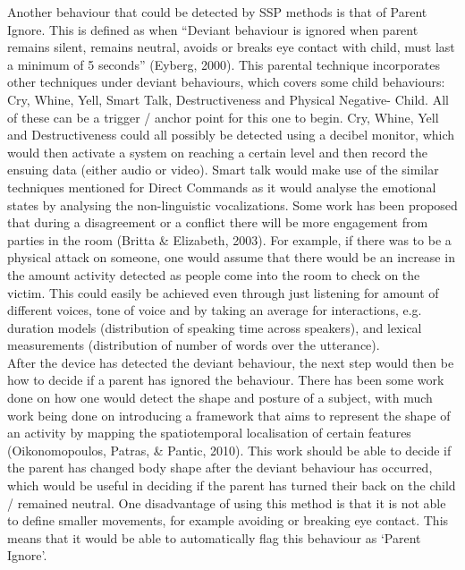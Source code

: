 \documentclass[a4paper,11pt]{report}
\begin{document}
Another behaviour that could be detected by SSP methods is that of Parent Ignore. This is defined as when “Deviant behaviour is ignored when parent remains silent, remains neutral, avoids or breaks eye contact with child, must last a minimum of 5 seconds” (Eyberg, 2000). This parental technique incorporates other techniques under deviant behaviours, which covers some child behaviours: Cry, Whine, Yell, Smart Talk, Destructiveness and Physical Negative- Child. All of these can be a trigger / anchor point for this one to begin. Cry, Whine, Yell and Destructiveness could all possibly be detected using a decibel monitor, which would then activate a system on reaching a certain level and then record the ensuing data (either audio or video). Smart talk would make use of the similar techniques mentioned for Direct Commands as it would analyse the emotional states by analysing the non-linguistic vocalizations. Some work has been proposed that during a disagreement or a conflict there will be more engagement from parties in the room (Britta \& Elizabeth, 2003). For example, if there was to be a physical attack on someone, one would assume that there would be an increase in the amount activity detected as people come into the room to check on the victim. This could easily be achieved even through just listening for amount of different voices, tone of voice and by taking an average for interactions, e.g. duration models (distribution of speaking time across speakers), and lexical measurements (distribution of number of words over the utterance).\\

After the device has detected the deviant behaviour, the next step would then be how to decide if a parent has ignored the behaviour. There has been some work done on how one would detect the shape and posture of a subject, with much work being done on introducing a framework that aims to represent the shape of an activity by mapping the spatiotemporal localisation of certain features (Oikonomopoulos, Patras, \& Pantic, 2010). This work should be able to decide if the parent has changed body shape after the deviant behaviour has occurred, which would be useful in deciding if the parent has turned their back on the child / remained neutral. One disadvantage of using this method is that it is not able to define smaller movements, for example avoiding or breaking eye contact. This means that it would be able to automatically flag this behaviour as ‘Parent Ignore’.\\
\end{document}
